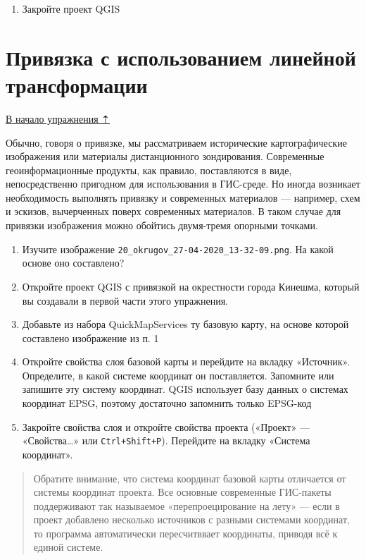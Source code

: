 \documentclass[
  12pt,
]{book}
\providecommand{\tightlist}{%
  \setlength{\itemsep}{0pt}\setlength{\parskip}{0pt}}
\begin{document}
\begin{enumerate}
\def\labelenumi{\arabic{enumi}.}
\setcounter{enumi}{13}
\tightlist
\item
  Закройте проект QGIS
\end{enumerate}

\hypertarget{raster-reference-linear}{%
\section{Привязка с использованием линейной трансформации}\label{raster-reference-linear}}

\protect\hyperlink{raster-reference}{В начало упражнения ⇡}

Обычно, говоря о привязке, мы рассматриваем исторические картографические изображения или материалы дистанционного зондирования. Современные геоинформационные продукты, как правило, поставляются в виде, непосредственно пригодном для использования в ГИС-среде. Но иногда возникает необходимость выполнять привязку и современных материалов --- например, схем и эскизов, вычерченных поверх современных материалов. В таком случае для привязки изображения можно обойтись двумя-тремя опорными точками.

\begin{enumerate}
\def\labelenumi{\arabic{enumi}.}
\item
  Изучите изображение \texttt{20\_okrugov\_27-04-2020\_13-32-09.png}. На какой основе оно составлено?
\item
  Откройте проект QGIS с привязкой на окрестности города Кинешма, который вы создавали в первой части этого упражнения.
\item
  Добавьте из набора QuickMapServices ту базовую карту, на основе которой составлено изображение из п. 1
\item
  Откройте свойства слоя базовой карты и перейдите на вкладку «Источник». Определите, в какой системе координат он поставляется. Запомните или запишите эту систему координат. QGIS использует базу данных о системах координат EPSG, поэтому достаточно запомнить только EPSG-код
\item
  Закройте свойства слоя и откройте свойства проекта («Проект» --- «Свойства\ldots» или \texttt{Ctrl+Shift+P}). Перейдите на вкладку «Система координат».
\end{enumerate}

\begin{quote}
Обратите внимание, что система координат базовой карты отличается от системы координат проекта. Все основные современные ГИС-пакеты поддерживают так называемое «перепроецирование на лету» --- если в проект добавлено несколько источников с разными системами координат, то программа автоматически пересчитввает координаты, приводя всё к единой системе.
\end{quote}
\end{document}
